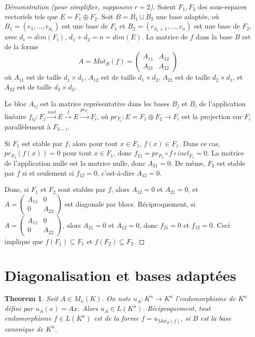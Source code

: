 \documentclass{article}
\newtheorem{theorem}{Theorem}
\begin{document}
\begin{proof}[Démonstration (pour simplifier, supposons $r=2$)]
Soient $F_1, F_2$ des sous-espaces vectoriels tels que $E = F_1 \oplus F_2$. Soit $B = B_1 \sqcup B_2$ une base adaptée, où $B_1 = (e_1, \ldots, e_{d_1})$ est une base de $F_1$ et $B_2 = (e_{d_1+1}, \ldots, e_n)$ est une base de $F_2$, avec $d_i = dim(F_i)$, $d_1 + d_2 = n = dim(E)$.
La matrice de $f$ dans la base $B$ est de la forme
\[ A = Mat_B(f) = \begin{pmatrix} A_{11} & A_{12} \\ A_{21} & A_{22} \end{pmatrix} \]
où $A_{11}$ est de taille $d_1 \times d_1$, $A_{12}$ est de taille $d_1 \times d_2$, $A_{21}$ est de taille $d_2 \times d_1$, et $A_{22}$ est de taille $d_2 \times d_2$.

Le bloc $A_{ij}$ est la matrice représentative dans les bases $B_j$ et $B_i$ de l'application linéaire $f_{ij} : F_j \xrightarrow{incl} E \xrightarrow{f} E \xrightarrow{pr_{F_i}} F_i$, où $pr_{F_i}: E = F_1 \oplus F_2 \to F_i$ est la projection sur $F_i$ parallèlement à $F_{3-i}$.

Si $F_1$ est stable par $f$, alors pour tout $x \in F_1$, $f(x) \in F_1$. Dans ce cas, $pr_{F_2}(f(x)) = 0$ pour tout $x \in F_1$, donc $f_{21} = pr_{F_2} \circ f \circ incl_{F_1} = 0$. La matrice de l'application nulle est la matrice nulle, donc $A_{21} = 0$.
De même, $F_2$ est stable par $f$ si et seulement si $f_{12} = 0$, c'est-à-dire $A_{12} = 0$.

Donc, si $F_1$ et $F_2$ sont stables par $f$, alors $A_{12} = 0$ et $A_{21} = 0$, et $A = \begin{pmatrix} A_{11} & 0 \\ 0 & A_{22} \end{pmatrix}$ est diagonale par blocs. Réciproquement, si $A = \begin{pmatrix} A_{11} & 0 \\ 0 & A_{22} \end{pmatrix}$, alors $A_{21} = 0$ et $A_{12} = 0$, donc $f_{21} = 0$ et $f_{12} = 0$. Ceci implique que $f(F_1) \subseteq F_1$ et $f(F_2) \subseteq F_2$.
\end{proof}

\section{Diagonalisation et bases adaptées}

\begin{theorem}
Soit $A \in M_n(K)$. On note $u_A: K^n \to K^n$ l'endomorphisme de $K^n$ défini par $u_A(x) = Ax$. Alors $u_A \in L(K^n)$. Réciproquement, tout endomorphisme $f \in L(K^n)$ est de la forme $f = u_{Mat_B(f)}$, si $B$ est la base canonique de $K^n$.
\end{theorem}
\end{document}
